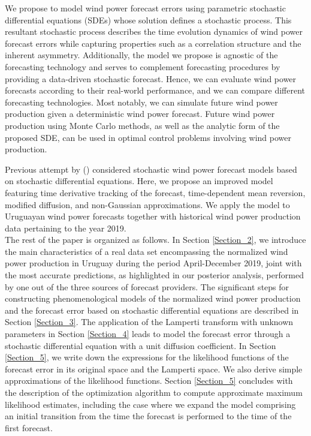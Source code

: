 \documentclass[11pt]{article}
\theoremstyle{definition}
\begin{document}
We propose to model wind power forecast errors using parametric stochastic differential equations (SDEs) whose solution defines a stochastic process. This resultant stochastic process describes the time evolution dynamics of wind power forecast errors while capturing properties such as a correlation structure and the inherent asymmetry. Additionally, the model we propose is agnostic of the forecasting technology and serves to complement forecasting procedures by providing a data-driven stochastic forecast. Hence, we can evaluate wind power forecasts according to their real-world performance, and we can compare different forecasting technologies. Most notably, we can simulate future wind power production given a deterministic wind power forecast. Future wind power production using Monte Carlo methods, as well as the analytic form of the proposed SDE, can be used in optimal control problems involving wind power production.

Previous attempt by (\cite{mozuma}) considered stochastic wind power forecast models based on stochastic differential equations. Here, we propose an improved model featuring time derivative tracking of the forecast, time-dependent mean reversion, modified diffusion, and non-Gaussian approximations. We apply the model to Uruguayan wind power forecasts together with historical wind power production data pertaining to the year 2019. \\

The rest of the paper is organized as follows. In Section \ref{Section_2}, we introduce the main characteristics of a real data set encompassing the normalized wind power production in Uruguay during the period April-December 2019, joint with the most accurate predictions, as highlighted in our posterior analysis, performed by one out of the three sources of forecast providers. The significant steps for constructing phenomenological models of the normalized wind power production and the forecast error based on stochastic differential equations are described in Section \ref{Section_3}. The application of the Lamperti transform with unknown parameters in Section \ref{Section_4} leads to model the forecast error through a stochastic differential equation with a unit diffusion coefficient. In Section \ref{Section_5}, we write down the expressions for the likelihood functions of the forecast error in its original space and the Lamperti space. We also derive simple approximations of the likelihood functions. Section \ref{Section_5} concludes with the description of the optimization algorithm to compute approximate maximum likelihood estimates, including the case where we expand the model comprising an initial transition from the time the forecast is performed to the time of the first forecast.
\end{document}
